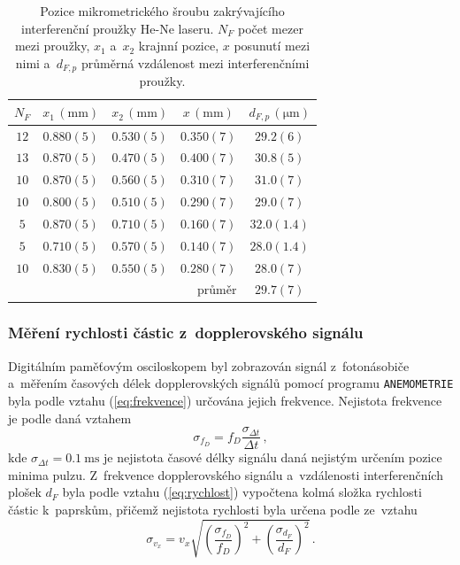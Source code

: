 \documentclass{../concepts/titul_zprava_p/prepareprotokolZprava} %
\newcommand{\relative}[1]{
\frac{\sigma_{#1}}{#1}
}
\newcommand{\squared}[1]{
\left( #1 \right)^2
}
\newcommand{\relsqr}[1]{
\squared{\relative{#1}}
}
\begin{document}
\begin{table}[!htbp]
\centering
\caption{Pozice mikrometrického šroubu zakrývajícího interferenční proužky He-Ne laseru. $N_F$ počet mezer mezi proužky,
$x_1$ a~$x_2$ krajnní pozice, $x$ posunutí mezi nimi a~$d_{F,p}$ průměrná vzdálenost mezi interferenčními proužky.}
\begin{tabular}{ccccc}
 \toprule
 $N_F$ & $x_1\, (\mathrm{mm})$ & $x_2\, (\mathrm{mm})$ & $x\, (\mathrm{mm})$ & $d_{F,p}\, (\unit{\micro \meter})$ \\
 \midrule
 $12$ & $0.880(5)$ & $0.530(5)$ & $0.350(7)$ & $29.2(6)$ \\
 $13$ & $0.870(5)$ & $0.470(5)$ & $0.400(7)$ & $30.8(5)$ \\
 $10$ & $0.870(5)$ & $0.560(5)$ & $0.310(7)$ & $31.0(7)$ \\
 $10$ & $0.800(5)$ & $0.510(5)$ & $0.290(7)$ & $29.0(7)$ \\
 $5$ & $0.870(5)$ & $0.710(5)$ & $0.160(7)$ & $32.0(1.4)$ \\
 $5$ & $0.710(5)$ & $0.570(5)$ & $0.140(7)$ & $28.0(1.4)$ \\
 $10$ & $0.830(5)$ & $0.550(5)$ & $0.280(7)$ & $28.0(7)$ \\
 \midrule
 \multicolumn{4}{r}{průměr} & $29.7(7)$ \\
 \bottomrule
\end{tabular}
\label{tab:projekce}
\end{table}



\subsubsection{Měření rychlosti částic z~dopplerovského signálu}

Digitálním paměťovým osciloskopem byl zobrazován signál z~fotonásobiče a~měřením časových délek dopplerovských signálů
pomocí programu \texttt{ANEMOMETRIE} byla podle vztahu (\ref{eq:frekvence}) určována jejich frekvence. 
Nejistota frekvence je podle \cite{englich} daná vztahem
\begin{equation}
    \label{eq:sigma_f}
    \sigma_{f_D} = f_D \relative{\Delta t} \,,
\end{equation}
kde $\sigma_{\Delta t} = \qty{0.1}{\milli \second}$ je nejistota časové délky signálu daná nejistým určením pozice minima pulzu.
Z~frekvence dopplerovského signálu a~vzdálenosti interferenčních plošek $d_F$ byla podle vztahu (\ref{eq:rychlost})
vypočtena kolmá složka rychlosti částic k~paprskům, přičemž nejistota rychlosti byla určena podle \cite{englich} ze~vztahu
\begin{equation}
    \label{eq:sigma_vx}
    \sigma_{v_x} = v_x \sqrt{ \relsqr{f_D} + \relsqr{d_F}} \,.
\end{equation}
\end{document}
